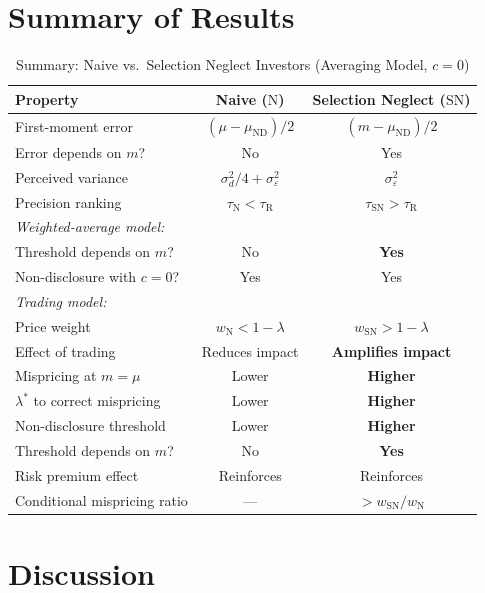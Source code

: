 \documentclass[12pt]{article}
\theoremstyle{plain}
\theoremstyle{definition}
\newcommand{\ND}{\mathrm{ND}}
\newcommand{\R}{\mathrm{R}}
\newcommand{\SN}{\mathrm{SN}}
\newcommand{\N}{\mathrm{N}}
\begin{document}
\section{Summary of Results}
\label{sec:summary}

\begin{table}[h!]
\centering
\caption{Summary: Naive vs.\ Selection Neglect Investors (Averaging Model, $c = 0$)}
\label{tab:summary}
\begin{tabular}{lcc}
\toprule
Property & Naive ($\N$) & Selection Neglect ($\SN$) \\
\midrule
First-moment error & $(\mu - \mu_{\ND})/2$ & $(m - \mu_{\ND})/2$ \\
Error depends on $m$? & No & Yes \\
Perceived variance & $\sigma_d^2/4 + \sigma_\varepsilon^2$ & $\sigma_\varepsilon^2$ \\
Precision ranking & $\tau_\N < \tau_\R$ & $\tau_\SN > \tau_\R$ \\[3pt]
\midrule
\emph{Weighted-average model:} & & \\
\quad Threshold depends on $m$? & No & \textbf{Yes} \\
\quad Non-disclosure with $c = 0$? & Yes & Yes \\[3pt]
\midrule
\emph{Trading model:} & & \\
\quad Price weight & $w_\N < 1-\lambda$ & $w_\SN > 1-\lambda$ \\
\quad Effect of trading & Reduces impact & \textbf{Amplifies impact} \\
\quad Mispricing at $m = \mu$ & Lower & \textbf{Higher} \\
\quad $\lambda^*$ to correct mispricing & Lower & \textbf{Higher} \\
\quad Non-disclosure threshold & Lower & \textbf{Higher} \\
\quad Threshold depends on $m$? & No & \textbf{Yes} \\
\quad Risk premium effect & Reinforces & Reinforces \\
\quad Conditional mispricing ratio & --- & $> w_\SN/w_\N$ \\
\bottomrule
\end{tabular}
\end{table}


\section{Discussion}
\label{sec:discussion}
\end{document}
